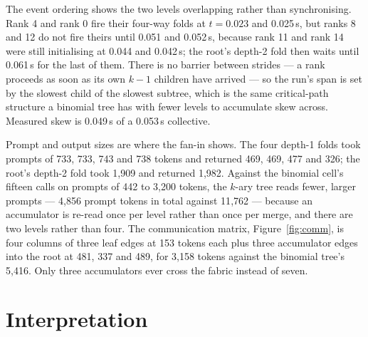\documentclass[11pt]{article}
\begin{document}
The event ordering shows the two levels overlapping rather than synchronising. Rank 4 and
rank 0 fire their four-way folds at $t=0.023$ and 0.025\,s, but ranks 8 and 12 do not fire
theirs until 0.051 and 0.052\,s, because rank 11 and rank 14 were still initialising at
0.044 and 0.042\,s; the root's depth-2 fold then waits until 0.061\,s for the last of them.
There is no barrier between strides --- a rank proceeds as soon as its own $k-1$ children
have arrived --- so the run's span is set by the slowest child of the slowest subtree, which
is the same critical-path structure a binomial tree has with fewer levels to accumulate skew
across. Measured skew is 0.049\,s of a 0.053\,s collective.

Prompt and output sizes are where the fan-in shows. The four depth-1 folds took prompts of
733, 733, 743 and 738 tokens and returned 469, 469, 477 and 326; the root's depth-2 fold
took 1{,}909 and returned 1{,}982. Against the binomial cell's fifteen calls on prompts of
442 to 3{,}200 tokens, the $k$-ary tree reads fewer, larger prompts --- 4{,}856 prompt
tokens in total against 11{,}762 --- because an accumulator is re-read once per level rather
than once per merge, and there are two levels rather than four. The communication matrix,
Figure~\ref{fig:comm}, is four columns of three leaf edges at 153 tokens each plus three
accumulator edges into the root at 481, 337 and 489, for 3{,}158 tokens against the binomial
tree's 5{,}416. Only three accumulators ever cross the fabric instead of seven.

\section{Interpretation}
\end{document}
